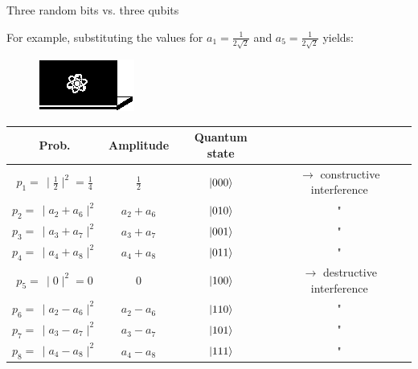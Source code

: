 \documentclass[10pt]{beamer}
\begin{document}
{
\begin{frame}[fragile]{Three random bits vs. three qubits}

For example, substituting the values for $a_1 = \frac{1}{2\sqrt{2}}$ and $a_5 = \frac{1}{2\sqrt{2}}$ yields:
\centering
\begin{figure}
\includegraphics[scale=1.2]{Vectors/laptop_q.eps}\\
\end{figure}
\vspace{0.5cm}
\begin{table}
\begin{tabular}{c | c | c c}
	Prob. & Amplitude & Quantum state &  \\
	\midrule
	$p_1 = \,\mid \frac{1}{2} \mid^2 = \frac{1}{4}$ & $\frac{1}{2}$ & $\ket{000}$ & $\rightarrow$ constructive interference \\
	$p_2 =\, \mid a_2+a_6 \mid^2$ & $a_2+a_6$ & $\ket{010}$ & " \\
	$p_3 = \,\mid a_3+a_7 \mid^2$ & $a_3+a_7$ & $\ket{001}$ & "\\
	$p_4 = \,\mid a_4+a_8 \mid^2$ & $a_4+a_8$ & $\ket{011}$ & "\\
	$p_5 = \,\mid 0 \mid^2 = 0$ & $0$ & $\ket{100}$ & $\rightarrow$ destructive interference \\
	$p_6 = \,\mid a_2-a_6 \mid^2$ & $a_2-a_6$ & $\ket{110}$ & "\\
	$p_7 = \,\mid a_3-a_7 \mid^2$ & $a_3-a_7$ & $\ket{101}$ & "\\
	$p_8 = \,\mid a_4-a_8 \mid^2$ & $a_4-a_8$ & $\ket{111}$ & "\\
	
\end{tabular}
\end{table}

\end{frame}
}
\end{document}
